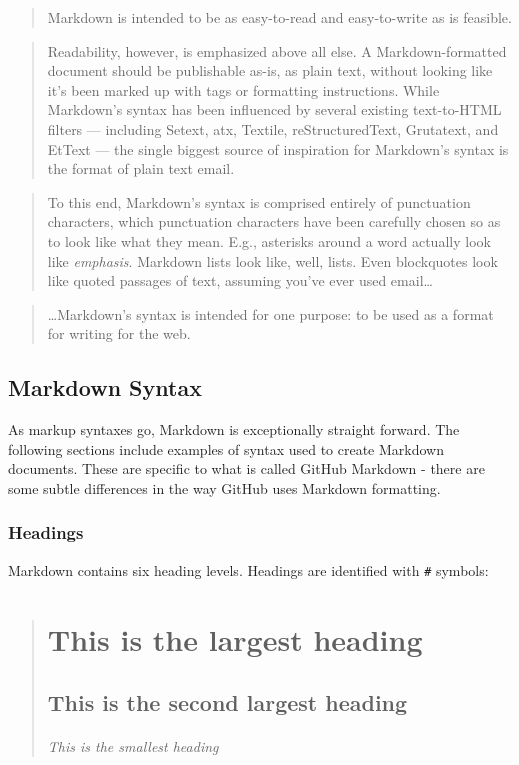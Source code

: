 \documentclass[]{book}
\let\oldsubparagraph\subparagraph
\renewcommand{\subparagraph}[1]{\oldsubparagraph{#1}\mbox{}}
\theoremstyle{definition}
\theoremstyle{definition}
\theoremstyle{definition}
\theoremstyle{remark}
\begin{document}
\begin{quote}
Markdown is intended to be as easy-to-read and easy-to-write as is
feasible.
\end{quote}

\begin{quote}
Readability, however, is emphasized above all else. A Markdown-formatted
document should be publishable as-is, as plain text, without looking
like it's been marked up with tags or formatting instructions. While
Markdown's syntax has been influenced by several existing text-to-HTML
filters --- including Setext, atx, Textile, reStructuredText, Grutatext,
and EtText --- the single biggest source of inspiration for Markdown's
syntax is the format of plain text email.
\end{quote}

\begin{quote}
To this end, Markdown's syntax is comprised entirely of punctuation
characters, which punctuation characters have been carefully chosen so
as to look like what they mean. E.g., asterisks around a word actually
look like \emph{emphasis}. Markdown lists look like, well, lists. Even
blockquotes look like quoted passages of text, assuming you've ever used
email\ldots{}
\end{quote}

\begin{quote}
\ldots{}Markdown's syntax is intended for one purpose: to be used as a
format for writing for the web.
\end{quote}

\section{Markdown Syntax}\label{markdown-syntax}

As markup syntaxes go, Markdown is exceptionally straight forward. The
following sections include examples of syntax used to create Markdown
documents. These are specific to what is called GitHub Markdown - there
are some subtle differences in the way GitHub uses Markdown formatting.

\subsection{Headings}\label{headings}

Markdown contains six heading levels. Headings are identified with
\texttt{\#} symbols:

\begin{quote}
\chapter{This is the largest heading}\label{this-is-the-largest-heading}

\section{This is the second largest
heading}\label{this-is-the-second-largest-heading}

\mbox{}%
\subparagraph{This is the smallest
heading}\label{this-is-the-smallest-heading}
\end{quote}
\end{document}
